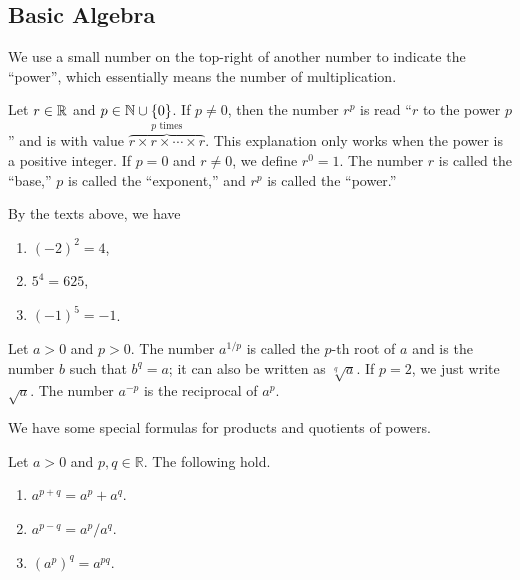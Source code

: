 \documentclass[11pt]{book}
\begin{document}
\subsection*{Basic Algebra}

We use a small number on the top-right of another number to indicate the ``power'', which essentially means the number of multiplication.
\begin{notation}
    Let $r\in\mathbb{R}$ and $p\in\mathbb{N}\cup\{0\}$. If $p\ne0$, then the number $r^p$ is read ``$r$ to the power $p$'' and is with value $\overbrace{r\times r\times \cdots\times r}^{\text{$p$ times}}$. This explanation only works when the power is a positive integer. If $p=0$ and $r\ne0$, we define $r^0=1$. The number $r$ is called the ``base,'' $p$ is called the ``exponent,'' and $r^p$ is called the ``power.''
\end{notation}

\begin{example}
    By the texts above, we have 
    \vspace{-1em}
    \begin{multicols}{3}
        \begin{enumerate}
            \item $(-2)^2=4$,
            \item $5^4=625$,
            \item $(-1)^5=-1$.
        \end{enumerate}
    \end{multicols}
    \vspace{0.1em}
\end{example}

\begin{notation}
    Let $a>0$ and $p>0$. The number $a^{1/p}$ is called the $p$-th root of $a$ and is the number $b$ such that $b^q=a$; it can also be written as $\sqrt[q]{a}$. If $p=2$, we just write $\sqrt{a}$. The number $a^{-p}$ is the reciprocal of $a^p$.
\end{notation}

We have some special formulas for products and quotients of powers.

\begin{theorem}
    Let $a>0$ and $p, q\in\mathbb R$. The following hold.
    \vspace{-1em}
    \begin{multicols}{3}
        \begin{enumerate}
            \item $a^{p+q}=a^p+a^q$.
            \item $a^{p-q}={a^p}/{a^q}$.
            \item $(a^p)^q=a^{pq}$.
        \end{enumerate}
    \end{multicols}
    \vspace{0.1em}
\end{theorem}
\end{document}
